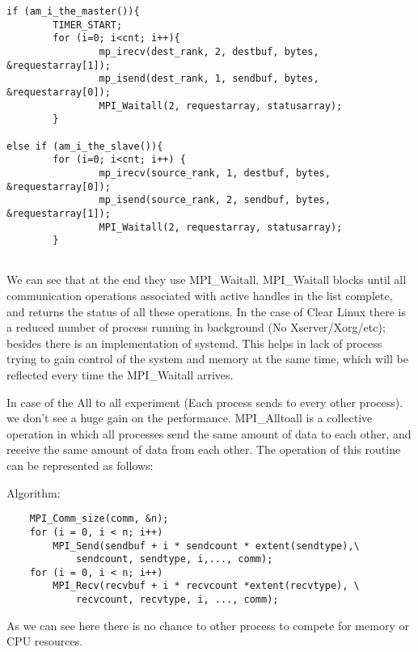 \documentclass[a4paper]{article}
\begin{document}
\begin{lstlisting} 
if (am_i_the_master()){                                                                           
        TIMER_START;                                                              
        for (i=0; i<cnt; i++){
                mp_irecv(dest_rank, 2, destbuf, bytes, &requestarray[1]);                 
                mp_isend(dest_rank, 1, sendbuf, bytes, &requestarray[0]);                 
                MPI_Waitall(2, requestarray, statusarray);                                
        }   
        
else if (am_i_the_slave()){
        for (i=0; i<cnt; i++) {
                mp_irecv(source_rank, 1, destbuf, bytes, &requestarray[0]);               
                mp_isend(source_rank, 2, sendbuf, bytes, &requestarray[1]);               
                MPI_Waitall(2, requestarray, statusarray);                                
        }                 
         
\end{lstlisting}


We can see that at the end they use MPI\_Waitall. MPI\_Waitall blocks until 
all communication operations associated with active handles in the list complete, 
and returns the status of all these operations. In the case of Clear Linux
there is a reduced number of process running in background (No
Xserver/Xorg/etc); besides there is an implementation of systemd. This helps
in lack of process trying to gain control of the system and memory at the same
time, which will be reflected every time the MPI\_Waitall arrives. 


In case of the All to all experiment (Each process sends to every other process). 
we don't see a huge gain on the performance. MPI\_Alltoall is a collective 
operation in which all processes send the same amount of data to each other, 
and receive the same amount of data from each other. The operation of this 
routine can be represented as follows:

Algorithm: 

\begin{lstlisting} 
    MPI_Comm_size(comm, &n); 
    for (i = 0, i < n; i++)
        MPI_Send(sendbuf + i * sendcount * extent(sendtype),\
            sendcount, sendtype, i,..., comm); 
    for (i = 0, i < n; i++) 
        MPI_Recv(recvbuf + i * recvcount *extent(recvtype), \
            recvcount, recvtype, i, ..., comm); 
\end{lstlisting}

As we can see here there is no chance to other process to compete for memory or
CPU resources. 
\end{document}
